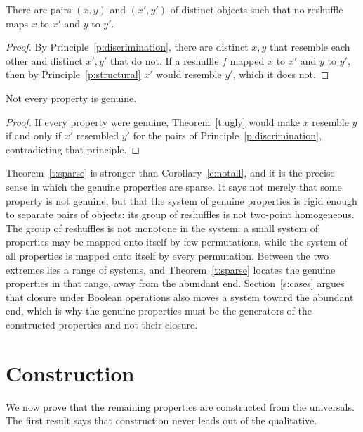 \documentclass{situationist-preprint}
\begin{document}
\begin{theorem}[Sparseness]\label{t:sparse}
There are pairs $(x,y)$ and $(x',y')$ of distinct objects such that no reshuffle maps $x$ to $x'$ and $y$ to $y'$.
\end{theorem}

\begin{proof}
By Principle~\ref{p:discrimination}, there are distinct $x,y$ that resemble each other and distinct $x',y'$ that do not. If a reshuffle $f$ mapped $x$ to $x'$ and $y$ to $y'$, then by Principle~\ref{p:structural} $x'$ would resemble $y'$, which it does not.
\end{proof}

\begin{corollary}\label{c:notall}
Not every property is genuine.
\end{corollary}

\begin{proof}
If every property were genuine, Theorem~\ref{t:ugly} would make $x$ resemble $y$ if and only if $x'$ resembled $y'$ for the pairs of Principle~\ref{p:discrimination}, contradicting that principle.
\end{proof}

Theorem~\ref{t:sparse} is stronger than Corollary~\ref{c:notall}, and it is the precise sense in which the genuine properties are sparse. It says not merely that some property is not genuine, but that the system of genuine properties is rigid enough to separate pairs of objects: its group of reshuffles is not two-point homogeneous. The group of reshuffles is not monotone in the system: a small system of properties may be mapped onto itself by few permutations, while the system of all properties is mapped onto itself by every permutation. Between the two extremes lies a range of systems, and Theorem~\ref{t:sparse} locates the genuine properties in that range, away from the abundant end. Section~\ref{s:cases} argues that closure under Boolean operations also moves a system toward the abundant end, which is why the genuine properties must be the generators of the constructed properties and not their closure.

\section{Construction}\label{s:construction}

We now prove that the remaining properties are constructed from the universals. The first result says that construction never leads out of the qualitative.
\end{document}
